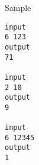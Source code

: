 Sample
\begin{verbatim}
input 
6 123 
output 
71 

input 
2 10 
output 
9

input 
6 12345 
output 
1 
\end{verbatim}